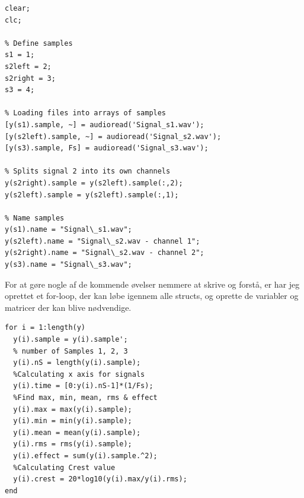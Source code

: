 \documentclass{article}
\begin{document}
\begin{lstlisting}[caption=Setup af signalerne i MATLAB som structs, label=lst:start]
clear;
clc;

% Define samples
s1 = 1;
s2left = 2;
s2right = 3;
s3 = 4;

% Loading files into arrays of samples
[y(s1).sample, ~] = audioread('Signal_s1.wav');
[y(s2left).sample, ~] = audioread('Signal_s2.wav');
[y(s3).sample, Fs] = audioread('Signal_s3.wav');

% Splits signal 2 into its own channels
y(s2right).sample = y(s2left).sample(:,2);
y(s2left).sample = y(s2left).sample(:,1);

% Name samples
y(s1).name = "Signal\_s1.wav";
y(s2left).name = "Signal\_s2.wav - channel 1";
y(s2right).name = "Signal\_s2.wav - channel 2";
y(s3).name = "Signal\_s3.wav";
\end{lstlisting}

For at gøre nogle af de kommende øvelser nemmere at skrive og forstå, er har jeg oprettet et for-loop, der kan løbe igennem alle structs, og oprette de variabler og matricer der kan blive nødvendige. 

\begin{lstlisting}[caption={Oprettelse af varaibler til alle structs}]
% Predefine variables for s1, s2left, s2right, s3 and s1reS
for i = 1:length(y)
  y(i).sample = y(i).sample';
  % number of Samples 1, 2, 3
  y(i).nS = length(y(i).sample);
  %Calculating x axis for signals
  y(i).time = [0:y(i).nS-1]*(1/Fs);
  %Find max, min, mean, rms & effect
  y(i).max = max(y(i).sample);
  y(i).min = min(y(i).sample);
  y(i).mean = mean(y(i).sample);
  y(i).rms = rms(y(i).sample);
  y(i).effect = sum(y(i).sample.^2);
  %Calculating Crest value
  y(i).crest = 20*log10(y(i).max/y(i).rms);
end
\end{lstlisting}






\end{document}
